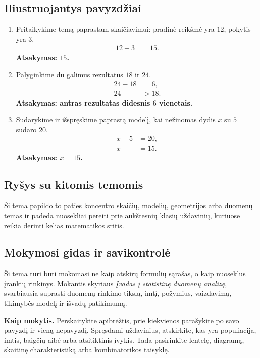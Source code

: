 \subsection{Iliustruojantys pavyzdžiai}
\begin{enumerate}[label=\arabic*.]
\item Pritaikykime temą paprastam skaičiavimui: pradinė reikšmė yra \(12\), pokytis yra \(3\).
\begin{align}
12+3&=15.
\end{align}
\textbf{Atsakymas: \(15\).}
\item Palyginkime du galimus rezultatus \(18\) ir \(24\).
\begin{align}
24-18&=6,\\
24&>18.
\end{align}
\textbf{Atsakymas: antras rezultatas didesnis \(6\) vienetais.}
\item Sudarykime ir išspręskime paprastą modelį, kai nežinomas dydis \(x\) su \(5\) sudaro \(20\).
\begin{align}
x+5&=20,\\
x&=15.
\end{align}
\textbf{Atsakymas: \(x=15\).}
\end{enumerate}

\subsection{Ryšys su kitomis temomis}
Ši tema papildo to paties koncentro skaičių, modelių, geometrijos arba duomenų temas ir padeda nuosekliai pereiti prie aukštesnių klasių uždavinių, kuriuose reikia derinti kelias matematikos sritis.

\subsection{Mokymosi gidas ir savikontrolė}

Ši tema turi būti mokomasi ne kaip atskirų formulių sąrašas, o kaip nuoseklus įrankių rinkinys. Mokantis skyriaus \textit{Įvadas į statistinę duomenų analizę}, svarbiausia suprasti duomenų rinkimo tikslą, imtį, požymius, vaizdavimą, tikimybės modelį ir išvadų patikimumą.

\textbf{Kaip mokytis.} Perskaitykite apibrėžtis, prie kiekvienos parašykite po savo pavyzdį ir vieną nepavyzdį. Spręsdami uždavinius, atskirkite, kas yra populiacija, imtis, baigčių aibė arba atsitiktinis įvykis. Tada pasirinkite lentelę, diagramą, skaitinę charakteristiką arba kombinatorikos taisyklę.

